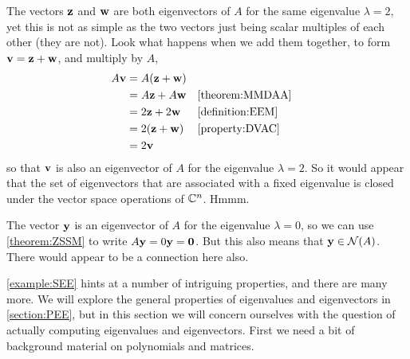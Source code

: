 \documentclass{ximera}
\begin{document}
\begin{example}
The vectors $\mathbf{z}$ and $\mathbf{w}$ are both eigenvectors of $A$ for
the same eigenvalue $\lambda=2$, yet this is not as simple as the two
vectors just being scalar multiples of each other (they are not).
Look what happens when we add them together, to form
$\mathbf{v}=\mathbf{z}+\mathbf{w}$, and multiply by $A$,
\begin{align*}
  A\mathbf{v}
  &=A(\mathbf{z}+\mathbf{w})\\
  &=A\mathbf{z}+A\mathbf{w}&&\ref{theorem:MMDAA}\\
  &=2\mathbf{z}+2\mathbf{w}&&\ref{definition:EEM}\\
  &=2(\mathbf{z}+\mathbf{w})&&\ref{property:DVAC}\\
  &=2\mathbf{v}
\end{align*}
so that $\mathbf{v}$ is also an eigenvector of $A$ for the eigenvalue
$\lambda=2$.  So it would appear that the set of eigenvectors that are
associated with a fixed eigenvalue is closed under the vector space
operations of $\mathbb{C}^{n}$.  Hmmm.

The vector $\mathbf{y}$ is an eigenvector of $A$ for the eigenvalue
$\lambda=0$, so we can use \ref{theorem:ZSSM} to write
$A\mathbf{y}=0\mathbf{y}=\mathbf{0}$.  But this also means that
$\mathbf{y}\in\mathcal{N}\!\left(A\right)$.  There would appear to be a connection here
also.
\end{example}

\ref{example:SEE} hints at a number of intriguing properties, and
there are many more.  We will explore the general properties of
eigenvalues and eigenvectors in \ref{section:PEE}, but in this section
we will concern ourselves with the question of actually computing
eigenvalues and eigenvectors.  First we need a bit of background
material on polynomials and matrices.
\end{document}
